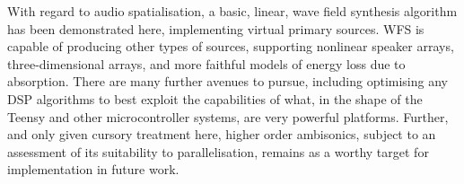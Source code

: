\documentclass[utf8]{FrontiersinHarvard}
\begin{document}
    With regard to audio spatialisation, a basic, linear, wave field synthesis
    algorithm has been demonstrated here, implementing virtual primary sources.
    WFS is capable of producing other types of sources, supporting nonlinear
    speaker arrays, three-dimensional arrays, and more faithful models of
    energy loss due to absorption.
    There are many further avenues to pursue, including optimising any DSP
    algorithms to best exploit the capabilities of what, in the shape of the
    Teensy and other microcontroller systems, are very powerful platforms.
    Further, and only given cursory treatment here, higher order ambisonics, subject
    to an assessment of its suitability to parallelisation, remains as a worthy
    target for implementation in future work.

    
    
\end{document}
